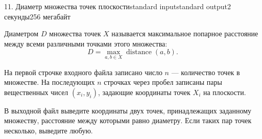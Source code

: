 \begin{problem}{11. Диаметр множества точек плоскости}{standard input}{standard output}{2 секунды}{256 мегабайт}

Диаметром $D$ множества точек $X$ называется максимальное попарное расстояние между всеми различными точками этого множества:
$$ D = \max\limits_{a, b \in X} \operatorname{distance}(a, b). $$

\InputFile

На первой строчке входного файла записано число $n$ — количество точек в множестве. На последующих $n$ строчках через пробел записаны пары вещественных чисел $(x_i, y_i)$, задающие координаты точек $X_i$ на плоскости.

\OutputFile
В выходной файл выведите координаты двух точек, принадлежащих заданному множеству, расстояние между которыми равно диаметру. Если таких пар точек несколько, выведите любую.

\Examples

\begin{example}%
%
\end{example}

\begin{example}
%
\end{example}

\end{problem}
